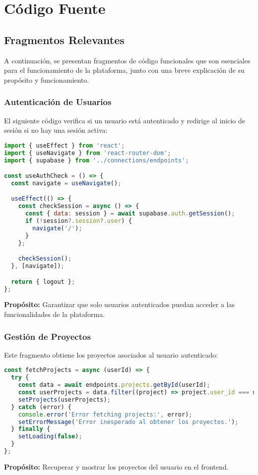 \section{Código Fuente}

\subsection{Fragmentos Relevantes}
A continuación, se presentan fragmentos de código funcionales que son esenciales para el funcionamiento de la plataforma, junto con una breve explicación de su propósito y funcionamiento.

\subsubsection{Autenticación de Usuarios}
El siguiente código verifica si un usuario está autenticado y redirige al inicio de sesión si no hay una sesión activa:
\begin{lstlisting}[language=JavaScript]
import { useEffect } from 'react';
import { useNavigate } from 'react-router-dom';
import { supabase } from '../connections/endpoints';

const useAuthCheck = () => {
  const navigate = useNavigate();

  useEffect(() => {
    const checkSession = async () => {
      const { data: session } = await supabase.auth.getSession();
      if (!session?.session?.user) {
        navigate('/');
      }
    };

    checkSession();
  }, [navigate]);

  return { logout };
};
\end{lstlisting}
\textbf{Propósito:} Garantizar que solo usuarios autenticados puedan acceder a las funcionalidades de la plataforma.
\newpage
\subsubsection{Gestión de Proyectos}
Este fragmento obtiene los proyectos asociados al usuario autenticado:
\begin{lstlisting}[language=JavaScript]
const fetchProjects = async (userId) => {
  try {
    const data = await endpoints.projects.getById(userId);
    const userProjects = data.filter((project) => project.user_id === userId);
    setProjects(userProjects);
  } catch (error) {
    console.error('Error fetching projects:', error);
    setErrorMessage('Error inesperado al obtener los proyectos.');
  } finally {
    setLoading(false);
  }
};
\end{lstlisting}
\textbf{Propósito:} Recuperar y mostrar los proyectos del usuario en el frontend.

